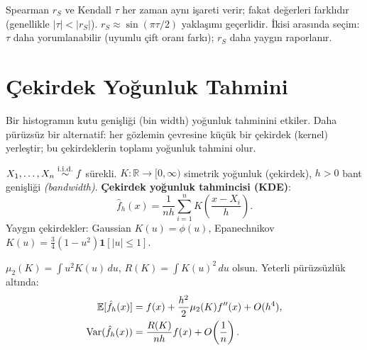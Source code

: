 \begin{hataanalizi}
Spearman $r_S$ ve Kendall $\tau$ her zaman aynı işareti verir; fakat değerleri farklıdır (genellikle $|\tau|<|r_S|$). $r_S\approx\sin(\pi\tau/2)$ yaklaşımı geçerlidir. İkisi arasında seçim: $\tau$ daha yorumlanabilir (uyumlu çift oranı farkı); $r_S$ daha yaygın raporlanır.
\end{hataanalizi}

\section{Çekirdek Yoğunluk Tahmini}
\label{sec:kde}

\begin{kesif}
Bir histogramın kutu genişliği (bin width) yoğunluk tahminini etkiler. Daha pürüzsüz bir alternatif: her gözlemin çevresine küçük bir çekirdek (kernel) yerleştir; bu çekirdeklerin toplamı yoğunluk tahmini olur.
\end{kesif}

\begin{tanim}\label{def:kde}
$X_1,\ldots,X_n\overset{\text{i.i.d.}}{\sim} f$ sürekli. $K:\mathbb{R}\to[0,\infty)$ simetrik yoğunluk (çekirdek), $h>0$ bant genişliği \emph{(bandwidth)}. \textbf{Çekirdek yoğunluk tahmincisi (KDE)}:
\[
  \hat{f}_h(x) = \frac{1}{nh}\sum_{i=1}^n K\!\left(\frac{x-X_i}{h}\right).
\]
Yaygın çekirdekler: Gaussian $K(u)=\phi(u)$, Epanechnikov $K(u)=\tfrac{3}{4}(1-u^2)\mathbf{1}[|u|\leq1]$.
\end{tanim}

\begin{teorem}\label{thm:kde_beklenti_varyans}
$\mu_2(K)=\int u^2 K(u)\,du$, $R(K)=\int K(u)^2\,du$ olsun. Yeterli pürüzsüzlük altında:
\begin{align*}
  \mathbb{E}[\hat{f}_h(x)] &= f(x) + \frac{h^2}{2}\mu_2(K)f''(x) + O(h^4), \\
  \operatorname{Var}(\hat{f}_h(x)) &= \frac{R(K)}{nh}f(x) + O\!\left(\frac{1}{n}\right).
\end{align*}
\end{teorem}

